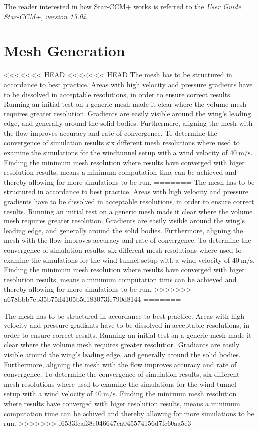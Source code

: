   The reader interested in how Star-CCM+ works is referred to the \emph{User Guide Star-CCM+, version 13.02}.

\section{Mesh Generation}
\label{sec:mesh}
<<<<<<< HEAD
<<<<<<< HEAD
  The mesh has to be structured in accordance to best practice. Areas with high velocity and pressure gradients have to be dissolved in acceptable resolutions, in order to ensure correct results. Running an initial test on a generic mesh made it clear where the volume mesh requires greater resolution. Gradients are easily visible around the wing's leading edge, and generally around the solid bodies. Furthermore, aligning the mesh with the flow improves accuracy and rate of convergence. To determine the convergence of simulation results six different mesh resolutions where used to examine the simulations for the windtunnel setup with a wind velocity of $\SI{40}{\metre\per\second}$. Finding the minimum mesh resolution where results have converged with higer resolution results, means a minimum computation time can be achieved and thereby allowing for more simulations to be run.
=======
  The mesh has to be structured in accordance to best practice. Areas with high velocity and pressure gradients have to be dissolved in acceptable resolutions, in order to ensure correct results. Running an initial test on a generic mesh made it clear where the volume mesh requires greater resolution. Gradients are easily visible around the wing's leading edge, and generally around the solid bodies. Furthermore, aligning the mesh with the flow improves accuracy and rate of convergence. To determine the convergence of simulation results, six different mesh resolutions where used to examine the simulations for the wind tunnel setup with a wind velocity of $\SI{40}{\metre\per\second}$. Finding the minimum mesh resolution where results have converged with higer resolution results, means a minimum computation time can be achieved and thereby allowing for more simulations to be run.
>>>>>>> a678bbb7eb35b75ff4105b50183073fe790d8144
=======

  The mesh has to be structured in accordance to best practice. Areas with high velocity and pressure gradiants have to be dissolved in acceptable resolutions, in order to ensure correct results. Running an initial test on a generic mesh made it clear where the volume mesh requires greater resolution. Gradiants are easily visible around the wing's leading edge, and generally around the solid bodies. Furthermore, aligning the mesh with the flow improves accuracy and rate of convergence. To determine the convergence of simulation results, six different mesh resolutions where used to examine the simulations for the wind tunnel setup with a wind velocity of $\SI{40}{\metre\per\second}$. Finding the minimum mesh resolution where results have converged with higer resolution results, means a minimum computation time can be achived and thereby allowing for more simulations to be run.
>>>>>>> f6533fcaf38e046647ca045574156d7fc60aa5e3

